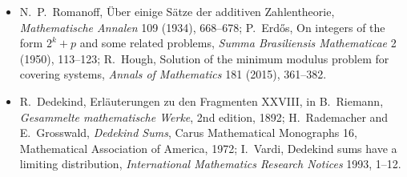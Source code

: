\begin{itemize}
(1935), 205--213.
\item N.~P.~Romanoff, Über einige Sätze der additiven Zahlentheorie, \emph{Mathematische Annalen} 109 (1934), 668--678; P.~Erd\H os, On integers of the form $2^k+p$ and some related
problems, \emph{Summa Brasiliensis Mathematicae} 2 (1950), 113--123; R.~Hough, Solution of the minimum modulus problem for covering systems, \emph{Annals of Mathematics} 181 (2015),
361--382.
\item R.~Dedekind, Erläuterungen zu den Fragmenten XXVIII, in B.~Riemann, \emph{Gesammelte mathematische Werke}, 2nd edition, 1892; H.~Rademacher and E.~Grosswald, \emph{Dedekind Sums},
Carus Mathematical Monographs 16, Mathematical Association of America, 1972; I.~Vardi, Dedekind sums have a limiting distribution, \emph{International Mathematics Research Notices}
1993, 1--12.
\end{itemize}

